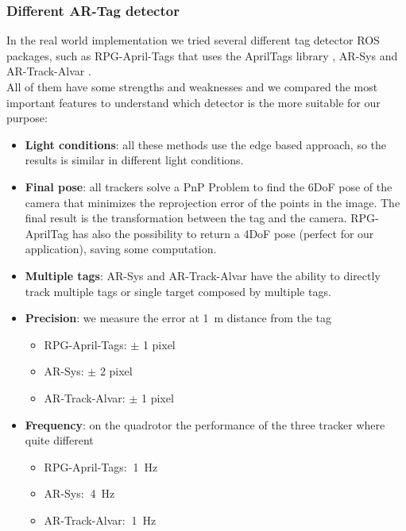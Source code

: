 \subsubsection{Different AR-Tag detector}
In the real world implementation we tried several different tag detector ROS packages, such as RPG-April-Tags \cite{rpgapriltags} that uses the AprilTags library \cite{apriltagslibrary}, AR-Sys \cite{arsys} and AR-Track-Alvar \cite{artrackalvar}.\\
All of them have some strengths and weaknesses and we compared the most important features to understand which detector is the more suitable for our purpose:
\begin{itemize}
\item \textbf{Light conditions}: all these methods use the edge based approach, so the results is similar in different light conditions.
\item \textbf{Final pose}: all trackers solve a PnP Problem to find the 6DoF pose of the camera that minimizes the reprojection error of the points in the image. The final result is the transformation between the tag and the camera. RPG-AprilTag has also the possibility to return a 4DoF pose (perfect for our application), saving some computation.
\item \textbf{Multiple tags}: AR-Sys and AR-Track-Alvar have the ability to directly track multiple tags or single target composed by multiple tags.
\item \textbf{Precision}: we measure the error at \SI{1}{\meter} distance from the tag
\begin{itemize}
\item RPG-April-Tags: $\pm$ 1 pixel 
\item AR-Sys: $\pm$ 2 pixel 
\item AR-Track-Alvar: $\pm$ 1 pixel 
\end{itemize}
\item \textbf{Frequency}: on the quadrotor the performance of the three tracker where quite different
\begin{itemize}
\item RPG-April-Tags: $~$\SI{1}{\Hz}
\item AR-Sys: $~$\SI{4}{\Hz}
\item AR-Track-Alvar: $~$\SI{1}{\Hz}
\end{itemize}
\end{itemize}

